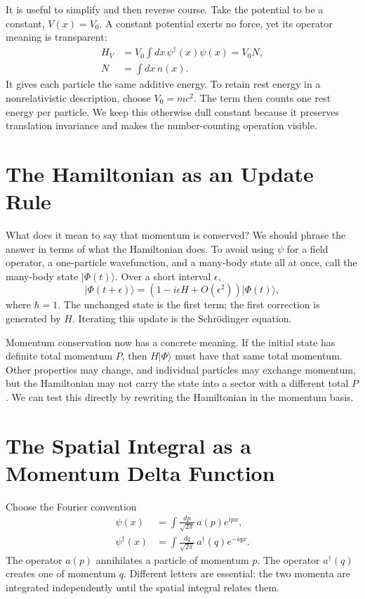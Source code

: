 It is useful to simplify and then reverse course. Take the potential to be a constant, \(V(x)=V_0\). A constant potential exerts no force, yet its operator meaning is transparent:
\begin{equation}
\begin{aligned}
H_V&=V_0\int dx\,\psi^\dagger(x)\psi(x)=V_0N,\\
N&=\int dx\,n(x).
\end{aligned}
\end{equation}
It gives each particle the same additive energy. To retain rest energy in a
nonrelativistic description, choose \(V_0=mc^2\). The term then counts one rest
energy per particle. We keep this otherwise dull constant because it preserves
translation invariance and makes the number-counting operation visible.

\section{The Hamiltonian as an Update Rule}

What does it mean to say that momentum is conserved? We should phrase the answer in terms of what the Hamiltonian does. To avoid using \(\psi\) for a field operator, a one-particle wavefunction, and a many-body state all at once, call the many-body state \(\lvert\Phi(t)\rangle\). Over a short interval \(\epsilon\),
\begin{equation}
\lvert\Phi(t+\epsilon)\rangle
=\left(1-i\epsilon H+O(\epsilon^2)\right)
\lvert\Phi(t)\rangle,
\label{eq:l9-short-update}
\end{equation}
where \(\hbar=1\). The unchanged state is the first term; the first correction is generated by \(H\). Iterating this update is the Schr\"odinger equation.

Momentum conservation now has a concrete meaning. If the initial state has definite total momentum \(P\), then \(H\lvert\Phi\rangle\) must have that same total momentum. Other properties may change, and individual particles may exchange momentum, but the Hamiltonian may not carry the state into a sector with a different total \(P\). We can test this directly by rewriting the Hamiltonian in the momentum basis.

\section{The Spatial Integral as a Momentum Delta Function}

Choose the Fourier convention
\begin{align}
\psi(x)&=\int\frac{dp}{\sqrt{2\pi}}\,a(p)e^{ipx},\\
\psi^\dagger(x)&=\int\frac{dq}{\sqrt{2\pi}}\,a^\dagger(q)e^{-iqx}.
\label{eq:l9-field-fourier}
\end{align}
The operator \(a(p)\) annihilates a particle of momentum \(p\).
The operator \(a^\dagger(q)\) creates one of momentum \(q\). Different letters
are essential: the two momenta are integrated independently until the spatial
integral relates them.

